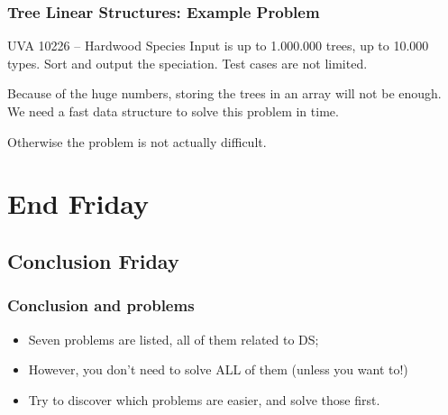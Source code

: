 \documentclass{beamer}
\begin{document}
\begin{frame}
  \frametitle{Tree Linear Structures: Example Problem}
  \begin{block}{UVA 10226 -- Hardwood Species}
    Input is up to 1.000.000 trees, up to 10.000 types. Sort and
    output the speciation. Test cases are not limited.
  \end{block}
  
  \bigskip

  Because of the huge numbers, storing the trees in an array will not
  be enough.  We need a fast data structure to solve this problem in
  time.

  Otherwise the problem is not actually difficult.
\end{frame}






\section{End Friday}
\subsection{Conclusion Friday}
\begin{frame}
  \frametitle{Conclusion and problems}
  
  \begin{itemize}
  \item Seven problems are listed, all of them related to DS;
  \item However, you don't need to solve ALL of them (unless you want
    to!)
  \item Try to discover which problems are easier, and solve those
    first.
  \end{itemize}

\end{frame}
\end{document}
